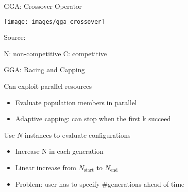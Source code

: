 \begin{frame}[c]{GGA: Crossover Operator}

\centering
\texttt{[image: images/gga\_crossover]}

{\footnotesize Source: }

\medskip

N: non-competitive C: competitive

\end{frame}

\begin{frame}[c]{GGA: Racing and Capping}

Can exploit parallel resources
\begin{itemize}
  \item Evaluate population members in parallel
  \item Adaptive capping: can stop when the first k succeed  
\end{itemize}

\pause
\medskip

Use $N$ instances to evaluate configurations
\begin{itemize}
  \item Increase N in each generation
  \item Linear increase from $N_{\text{start}}$ to $N_{\text{end}}$
  \item Problem: user has to specify \#generations ahead of time
\end{itemize}

\end{frame}


